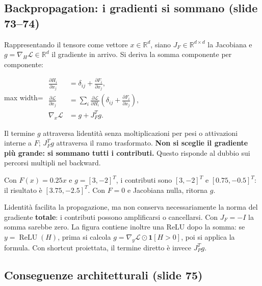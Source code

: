 \documentclass[11pt,a4paper,oneside,openany]{book}
\begin{document}
\subsection{Backpropagation: i gradienti si sommano (slide 73--74)}\label{f02-r1110}

Rappresentando il tensore come vettore \(x\in\mathbb{R}^d\), siano \(J_F\in\mathbb{R}^{d\times d}\) la Jacobiana e \(g=\nabla_H\mathcal L\in\mathbb{R}^d\) il gradiente in arrivo. Si deriva la somma componente per componente:

\begin{center}
\begin{adjustbox}{max width=\linewidth}
$\displaystyle 
\begin{aligned}
\frac{\partial H_i}{\partial x_j}&=\delta_{ij}+\frac{\partial F_i}{\partial x_j},\\
\frac{\partial\mathcal L}{\partial x_j}&=\sum_i\frac{\partial\mathcal L}{\partial H_i}\left(\delta_{ij}+\frac{\partial F_i}{\partial x_j}\right),\\
\boxed{\nabla_x\mathcal L}&=\boxed{g+J_F^Tg.}
\end{aligned}
$
\end{adjustbox}
\end{center}

Il termine \(g\) attraversa l\textquotesingle identità senza moltiplicazioni per pesi o attivazioni interne a \(F\); \(J_F^Tg\) attraversa il ramo trasformato. \textbf{Non si sceglie il gradiente più grande: si sommano tutti i contributi.} Questo risponde al dubbio sui percorsi multipli nel backward.

Con \(F(x)=0.25x\) e \(g=[3,-2]^T\), i contributi sono \([3,-2]^T\) e \([0.75,-0.5]^T\): il risultato è \([3.75,-2.5]^T\). Con \(F=0\) e Jacobiana nulla, ritorna \(g\).

L\textquotesingle identità facilita la propagazione, ma non conserva necessariamente la norma del gradiente \textbf{totale}: i contributi possono amplificarsi o cancellarsi. Con \(J_F=-I\) la somma sarebbe zero. La figura contiene inoltre una ReLU dopo la somma: se \(y=\operatorname{ReLU}(H)\), prima si calcola \(g=\nabla_y\mathcal L\odot\mathbf1[H>0]\), poi si applica la formula. Con shortcut proiettata, il termine diretto è invece \(J_P^Tg\).

\subsection{Conseguenze architetturali (slide 75)}\label{f02-r1128}
\end{document}
